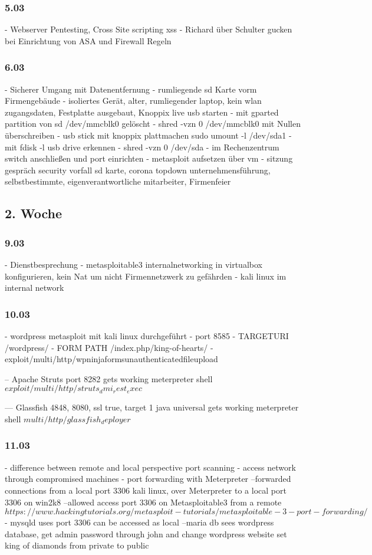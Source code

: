 \documentclass[english,runningheads,a4paper]{llncs}[2018/03/10]
\begin{document}
\subsubsection{5.03}
- Webserver Pentesting, Cross Site scripting xss
- Richard über Schulter gucken bei Einrichtung von ASA und Firewall Regeln

\subsubsection{6.03}
- Sicherer Umgang mit Datenentfernung
- rumliegende sd Karte vorm Firmengebäude 
- isoliertes Gerät, alter, rumliegender laptop, kein wlan zugangsdaten, Festplatte ausgebaut, Knoppix live usb starten
- mit gparted partition von sd /dev/mmcblk0 gelöscht
- shred -vzn 0 /dev/mmcblk0 mit Nullen überschreiben
- usb stick mit knoppix plattmachen sudo umount -l /dev/sda1
- mit fdisk -l usb drive erkennen
- shred -vzn 0 /dev/sda
- im Rechenzentrum switch anschließen und port einrichten
- metasploit aufsetzen über vm
- sitzung gespräch security vorfall sd karte, corona topdown unternehmensführung, selbstbestimmte, eigenverantwortliche mitarbeiter, Firmenfeier
\subsection{2. Woche}
\subsubsection{9.03}
- Dienstbesprechung
- metasploitable3 internalnetworking in virtualbox konfigurieren, kein Nat um nicht Firmennetzwerk zu gefährden
- kali linux im internal network

\subsubsection{10.03}
- wordpress metasploit mit kali linux durchgeführt
- port 8585
- TARGETURI	 /wordpress/
- FORM PATH	/index.php/king-of-hearts/ 
- exploit/multi/http/wpninjaformsunauthenticatedfileupload

-- Apache Struts port 8282 gets working meterpreter shell $exploit/multi/http/struts_dmi_rest_exec$

--- Glassfish 4848, 8080, ssl true, target 1 java universal gets working meterpreter shell
$multi/http/glassfish_deployer$

\subsubsection{11.03}
- difference between remote and local perspective port scanning
- access network through compromised machines
- port forwarding with Meterpreter
--forwarded connections from a local port 3306 kali linux, over Meterpreter to a local port 3306 on win2k8
--allowed access port 3306 on Metasploitable3 from a remote
$https://www.hackingtutorials.org/metasploit-tutorials/metasploitable-3-port-forwarding/$
- mysqld uses port 3306 can be accessed as local
--maria db sees wordpress database, get admin password through john and change wordpress website set king of diamonds from private to public
\end{document}
